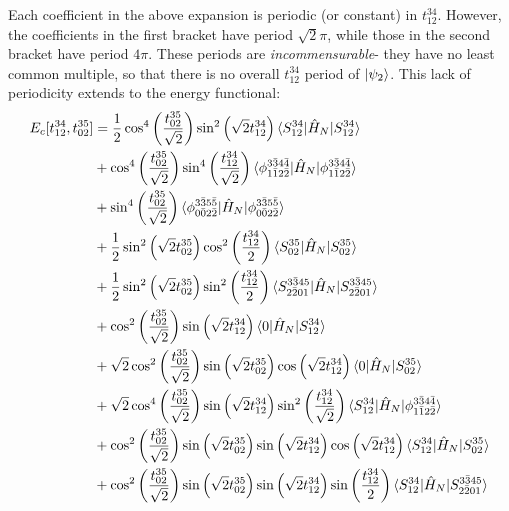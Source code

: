 \documentclass{article}
\begin{document}
Each coefficient in the above expansion is periodic (or constant) in $t_{12}^{34}$.  However, the coefficients in the first bracket have period $\sqrt{2}\pi$, while those in the second bracket have period $4\pi$.  These periods are \textit{incommensurable}- they have no least common multiple, so that there is no overall $t_{12}^{34}$ period of $\ket{\psi_2}$.  This lack of periodicity extends to the energy functional:  
\begin{align}
E_c[t_{12}^{34},t_{02}^{35}] &= \frac{1}{2}\cos^4\left(\frac{t_{02}^{35}}{\sqrt{2}}\right)\sin^2\left(\sqrt{2}t_{12}^{34}\right)\braket{S_{12}^{34}|\hat{H}_N|S_{12}^{34}} \\
&+\cos^4\left(\frac{t_{02}^{35}}{\sqrt{2}}\right)\sin^4\left(\frac{t_{12}^{34}}{\sqrt{2}}\right)\braket{\phi_{1\bar{1}2\bar{2}}^{3\bar{3}4\bar{4}}|\hat{H}_N|\phi_{1\bar{1}2\bar{2}}^{3\bar{3}4\bar{4}}}\\
&+\sin^4\left(\frac{t_{02}^{35}}{\sqrt{2}}\right)\braket{\phi_{0\bar{0}2\bar{2}}^{3\bar{3}5\bar{5}}|\hat{H}_N|\phi_{0\bar{0}2\bar{2}}^{3\bar{3}5\bar{5}}}\\
&+\frac{1}{2}\sin^2\left(\sqrt{2}t_{02}^{35}\right)\cos^2\left(\frac{t_{12}^{34}}{2}\right)\braket{S_{02}^{35}|\hat{H}_N|S_{02}^{35}}\\
&+\frac{1}{2}\sin^2\left(\sqrt{2}t_{02}^{35}\right)\sin^2\left(\frac{t_{12}^{34}}{2}\right)\braket{S_{2\bar{2}01}^{3\bar{3}45}|\hat{H}_N|S_{2\bar{2}01}^{3\bar{3}45}}\\
&+\cos^2\left(\frac{t_{02}^{35}}{\sqrt{2}}\right)\sin\left(\sqrt{2}t_{12}^{34}\right)\braket{0|\hat{H}_N|S_{12}^{34}}\\
&+\sqrt{2}\cos^2\left(\frac{t_{02}^{35}}{\sqrt{2}}\right)\sin\left(\sqrt{2}t_{02}^{35}\right)\cos\left(\sqrt{2}t_{12}^{34}\right)\braket{0|\hat{H}_N|S_{02}^{35}}\\
&+\sqrt{2}\cos^4\left(\frac{t_{02}^{35}}{\sqrt{2}}\right)\sin\left(\sqrt{2}t_{12}^{34}\right)\sin^2\left(\frac{t_{12}^{34}}{\sqrt{2}}\right)\braket{S_{12}^{34}|\hat{H}_N|\phi_{1\bar{1}2\bar{2}}^{3\bar{3}4\bar{4}}}\\
&+\cos^2\left(\frac{t_{02}^{35}}{\sqrt{2}}\right)\sin\left(\sqrt{2}t_{02}^{35}\right)\sin\left(\sqrt{2}t_{12}^{34}\right)\cos\left(\sqrt{2}t_{12}^{34}\right)\braket{S_{12}^{34}|\hat{H}_N|S_{02}^{35}}\\
&+\cos^2\left(\frac{t_{02}^{35}}{\sqrt{2}}\right)\sin\left(\sqrt{2}t_{02}^{35}\right)\sin\left(\sqrt{2}t_{12}^{34}\right)\sin\left(\frac{t_{12}^{34}}{2}\right)\braket{S_{12}^{34}|\hat{H}_N|S_{2\bar{2}01}^{3\bar{3}45}}\\

\end{align}
\end{document}
